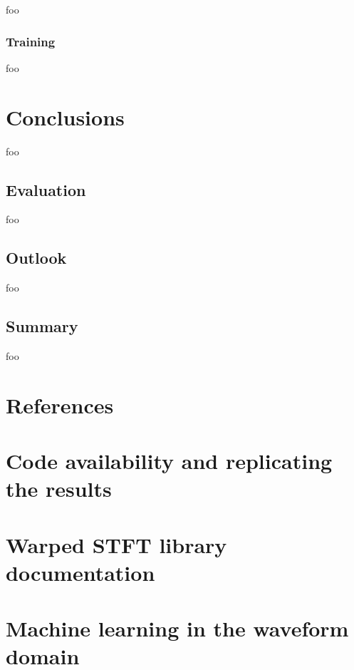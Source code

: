 \documentclass[letter,12pt,notitlepage]{article}
\begin{document}
foo

\subsubsection{Training}

foo

\vfill
\clearpage

\section{Conclusions}
\label{sec:conclusion}

foo

\subsection{Evaluation}

foo

\subsection{Outlook}

foo

\subsection{Summary}

foo

\vfill
\clearpage %

\section{References}
\printbibliography[heading=none]

\vfill
\clearpage %

\begin{appendices}

\section{Code availability and replicating the results}
\label{appendix:coderesultsrepro}

\section{Warped STFT library documentation}
\label{appendix:wstftdoc}

\section{Machine learning in the waveform domain}
\label{appendix:waveformml}

\end{appendices}
\end{document}
